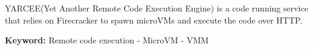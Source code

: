 \begin{ParsaAbstractLatin}
    YARCEE(Yet Another Remote Code Execution Engine) is a code running service
    that relies on Firecracker to spawn microVMs and execute the code over HTTP.


    \bigskip\noindent
    \textbf{Keyword:} Remote code execution - MicroVM - VMM
\end{ParsaAbstractLatin}
\clearpage


\titlepageLatin